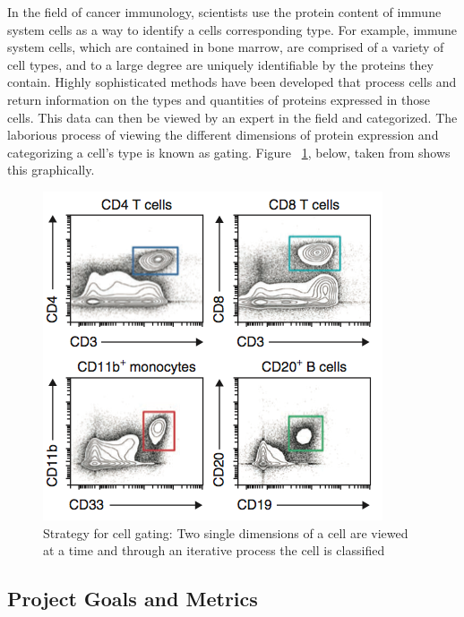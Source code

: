 \documentclass{article}
\begin{document}
In the field of cancer immunology, scientists use the protein content of immune system cells as a way to identify a cells corresponding type. For example, immune system cells, which are contained in bone marrow, are comprised of a variety of cell types, and to a large degree are uniquely identifiable by the proteins they contain. Highly sophisticated methods have been developed that process cells and return information on the types and quantities of proteins expressed in those cells. This data can then be viewed by an expert in the field and categorized. The laborious process of viewing the different dimensions of protein expression and categorizing a cell's type is known as gating. Figure ~\ref{CellGating}, below, taken from \cite{Amir:2013jp} shows this graphically.

\begin{figure}[ht]
\label{CellGating}
\vskip 0.2in
\begin{center}
\centerline{\includegraphics[width=\columnwidth]{CellGating}}
\caption{Strategy for cell gating: Two single dimensions of a cell are viewed at a time
and through an iterative process the cell is classified}
\end{center}
\vskip -0.2in
\end{figure} 

\subsection{Project Goals and Metrics}
\end{document}
